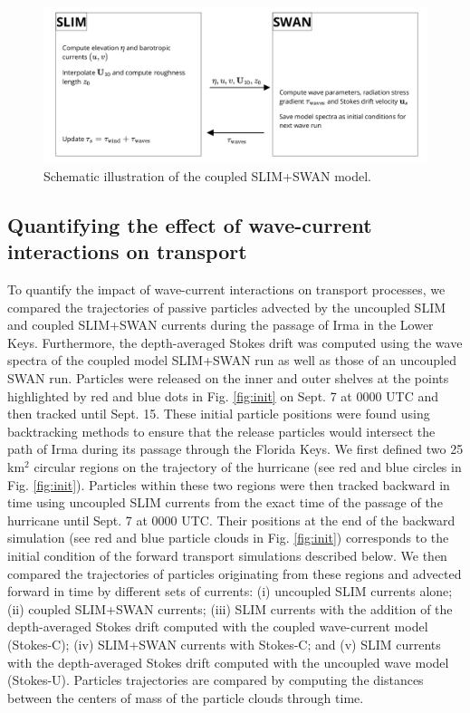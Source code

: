 \documentclass[preprint,12pt,authoryear]{elsarticle}
\begin{document}
\begin{figure}
    \centering
    \includegraphics[width=.99\textwidth]{fig/coupling_v2.png}
    \caption{Schematic illustration of the coupled SLIM+SWAN model.}
    \label{fig:coupling}
\end{figure}

\subsection{Quantifying the effect of wave-current interactions on transport}\label{sec:traj}

To quantify the impact of wave-current interactions on transport processes, we compared the trajectories of passive particles advected by the uncoupled SLIM and coupled SLIM+SWAN currents during the passage of Irma in the Lower Keys. Furthermore, the depth-averaged Stokes drift was computed using the wave spectra of the coupled model SLIM+SWAN run as well as those of an uncoupled SWAN run. Particles were released on the inner and outer shelves at the points highlighted by red and blue dots in Fig. \ref{fig:init} on Sept. 7 at 0000 UTC and then tracked until Sept. 15. These initial particle positions were found using backtracking methods \citep{spivakovskaya2005simulation} to ensure that the release particles would intersect the path of Irma during its passage through the Florida Keys. We first defined two 25 km$^\text{2}$ circular regions on the trajectory of the hurricane (see red and blue circles in Fig. \ref{fig:init}). Particles within these two regions were then tracked backward in time using uncoupled SLIM currents from the exact time of the passage of the hurricane until Sept. 7 at 0000 UTC. Their positions at the end of the backward simulation (see red and blue particle clouds in Fig. \ref{fig:init}) corresponds to the initial condition of the forward transport simulations described below. We then compared the trajectories of particles originating from these regions and advected forward in time by different sets of currents: (i) uncoupled SLIM currents alone; (ii) coupled SLIM+SWAN currents; (iii) SLIM currents with the addition of the depth-averaged Stokes drift computed with the coupled wave-current model (Stokes-C); (iv) SLIM+SWAN currents with Stokes-C; and (v) SLIM currents with the depth-averaged Stokes drift computed with the uncoupled wave model (Stokes-U). Particles trajectories are compared by computing the distances between the centers of mass of the particle clouds through time.
\end{document}
